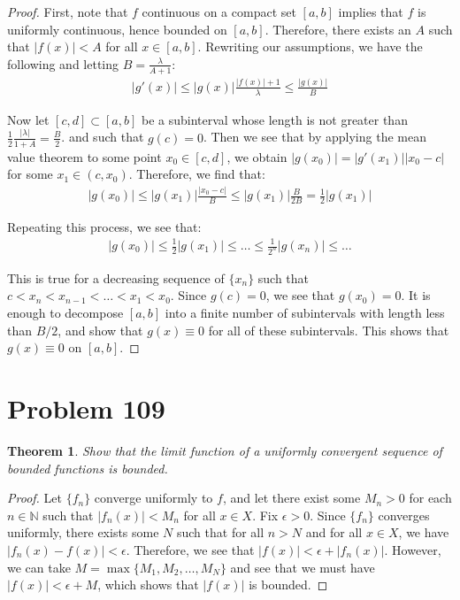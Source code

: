 \documentclass[psamsfonts]{amsart}
\newtheorem{thm}{Theorem}[section]
\theoremstyle{definition}
\theoremstyle{remark}
\numberwithin{equation}{section}
\begin{document}
\begin{proof}
First, note that $f$ continuous on a compact set $[a,b]$ implies that $f$ is uniformly continuous, hence bounded on $[a,b]$. Therefore, there exists an $A$ such that $|f(x)| < A$ for all $x \in [a,b]$. Rewriting our assumptions, we have the following and letting $B = \frac{\lambda}{A + 1}$:
\begin{eqnarray}
|g'(x)| \leq  |g(x)| \frac{|f(x)| + 1}{\lambda} \leq \frac{|g(x)|}{B} 
\end{eqnarray}

Now let $[c,d] \subset [a,b]$ be a subinterval whose length is not greater than $\frac{1}{2} \frac{|\lambda|}{1 +A} = \frac{B}{2}$. and such that $g(c) = 0$. Then we see that by applying the mean value theorem to some point $x_0 \in [c,d]$, we obtain $|g(x_0)| = |g'(x_1)| |x_0- c|$ for some $x_1 \in (c, x_0)$. Therefore, we find that:
\begin{eqnarray}
|g(x_0)| \leq |g(x_1)| \frac{| x_0 - c|}{B} \leq |g(x_1)| \frac{B}{2B} = \frac{1}{2} |g(x_1)|
\end{eqnarray}

Repeating this process, we see that:
\begin{eqnarray}
|g(x_0)| \leq \frac{1}{2} |g(x_1)| \leq \ldots \leq \frac{1}{2^n} |g(x_n)| \leq \ldots
\end{eqnarray}

This is true for a decreasing sequence of $\{ x_n \}$ such that $c < x_n < x_{n-1} < \ldots < x_1 < x_0$. Since $g(c) = 0$, we see that $g(x_0) = 0$. It is enough to decompose $[a,b]$ into a finite number of subintervals with length less than $B/2$, and show that $g(x) \equiv 0$ for all of these subintervals. This shows that $g(x) \equiv 0$ on $[a,b]$. 
\end{proof}

\section{Problem 109}

\begin{thm}
Show that the limit function of a uniformly convergent sequence of bounded functions is bounded.
\end{thm}

\begin{proof}
Let $\{ f_n \}$ converge uniformly to $f$, and let there exist some $M_n > 0$ for each $n \in \mathbb{N}$ such that $|f_n (x)| < M_n$ for all $x \in X$. Fix $\epsilon > 0$. Since $\{f_n \}$ converges uniformly, there exists some $N$ such that for all $n > N$ and for all $x \in X$, we have $|f_n(x) - f(x)| < \epsilon$. Therefore, we see that $|f(x)| < \epsilon + |f_n(x)|$. However, we can take $M = \max \{ M_1, M_2, \ldots, M_N \}$ and see that we must have $|f(x) | < \epsilon + M$, which shows that $|f(x)|$ is bounded.
\end{proof}
\end{document}
